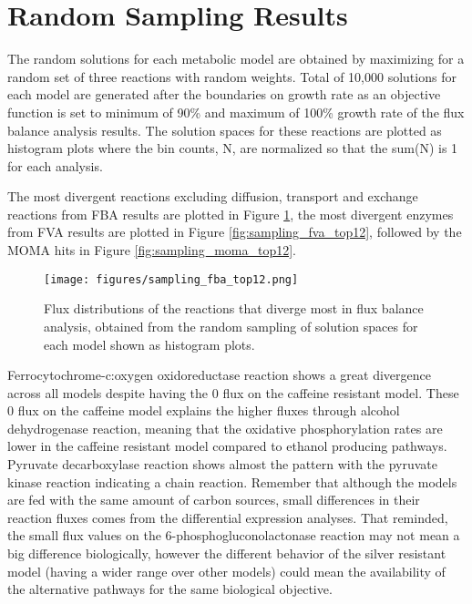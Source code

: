 \section{Random Sampling Results}

The random solutions for each metabolic model are obtained by maximizing for a random set of three reactions with random weights. Total of 10,000 solutions for each model are generated after the boundaries on growth rate as an objective function is set to minimum of 90\% and maximum of 100\% growth rate of the flux balance analysis results. The solution spaces for these reactions are plotted as histogram plots where the bin counts, N, are normalized so that the sum(N) is 1 for each analysis.

The most divergent reactions excluding diffusion, transport and exchange reactions from FBA results are plotted in Figure \ref{fig:sampling_fba_top12}, the most divergent enzymes from FVA results are plotted in Figure \ref{fig:sampling_fva_top12}, followed by the MOMA hits in Figure \ref{fig:sampling_moma_top12}.

\begin{figure}[H]
  \begin{center}
  \texttt{[image: figures/sampling\_fba\_top12.png]}
  \caption[Flux distributions of the reactions that diverge most in flux balance analysis, obtained from the random sampling of solution spaces for each model shown as histogram plots]{Flux distributions of the reactions that diverge most in flux balance analysis, obtained from the random sampling of solution spaces for each model shown as histogram plots.}
  \label{fig:sampling_fba_top12}
  \end{center}
\end{figure}

Ferrocytochrome-c:oxygen oxidoreductase reaction shows a great divergence across all models despite having the 0 flux on the caffeine resistant model. These 0 flux on the caffeine model explains the higher fluxes through alcohol dehydrogenase reaction, meaning that the oxidative phosphorylation rates are lower in the caffeine resistant model compared to ethanol producing pathways. Pyruvate decarboxylase reaction shows almost the pattern with the pyruvate kinase reaction indicating a chain reaction. Remember that although the models are fed with the same amount of carbon sources, small differences in their reaction fluxes comes from the differential expression analyses. That reminded, the small flux values on the 6-phosphogluconolactonase reaction may not mean a big difference biologically, however the different behavior of the silver resistant model (having a wider range over other models) could mean the availability of the alternative pathways for the same biological objective.


